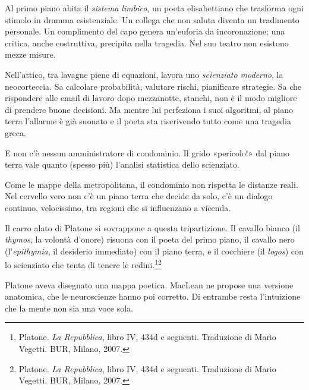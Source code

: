 Al primo piano abita il \textit{sistema limbico}, un poeta elisabettiano che trasforma ogni stimolo in dramma esistenziale. Un collega che non saluta diventa un tradimento personale. Un complimento del capo genera un'euforia da incoronazione; una critica, anche costruttiva, precipita nella tragedia. Nel suo teatro non esistono mezze misure.

Nell'attico, tra lavagne piene di equazioni, lavora uno \textit{scienziato moderno}, la neocorteccia. Sa calcolare probabilità, valutare rischi, pianificare strategie. Sa che rispondere alle email di lavoro dopo mezzanotte, stanchi, non è il modo migliore di prendere buone decisioni. Ma mentre lui perfeziona i suoi algoritmi, al piano terra l'allarme è già suonato e il poeta sta riscrivendo tutto come una tragedia greca.

E non c'è nessun amministratore di condominio. Il grido «pericolo!» dal piano terra vale quanto (spesso più) l'analisi statistica dello scienziato.

Come le mappe della metropolitana, il condominio non rispetta le distanze reali. Nel cervello vero non c'è un piano terra che decide da solo, c'è un dialogo continuo, velocissimo, tra regioni che si influenzano a vicenda.

Il carro alato di Platone si sovrappone a questa tripartizione. Il cavallo bianco (il \textit{thymos}, la volontà d'onore) risuona con il poeta del primo piano, il cavallo nero (l'\textit{epithymia}, il desiderio immediato) con il piano terra, e il cocchiere (il \textit{logos}) con lo scienziato che tenta di tenere le redini.\footnote{Platone. \textit{La Repubblica}, libro IV, 434d e seguenti. Traduzione di Mario Vegetti. BUR, Milano, 2007.}\footnote{Platone. \textit{La Repubblica}, libro IV, 434d e seguenti. Traduzione di Mario Vegetti. BUR, Milano, 2007.}

Platone aveva disegnato una mappa poetica. MacLean ne propose una versione anatomica, che le neuroscienze hanno poi corretto. Di entrambe resta l'intuizione che la mente non sia una voce sola.

